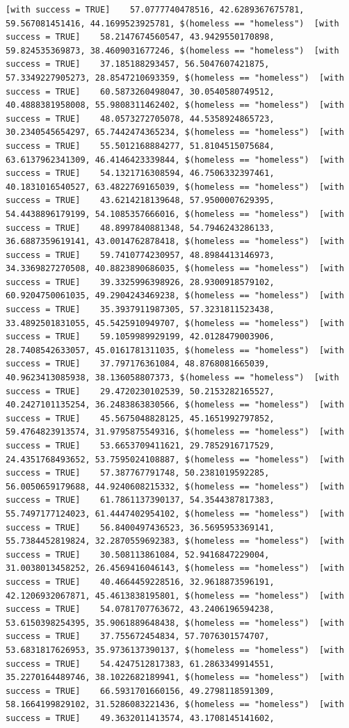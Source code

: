 \documentclass{tufte-book}\usepackage[]{graphicx}\usepackage[]{xcolor}
\makeatletter
\newenvironment{kframe}{%
 \def\at@end@of@kframe{}%
 \ifinner\ifhmode%
  \def\at@end@of@kframe{\end{minipage}}%
  \begin{minipage}{\columnwidth}%
 \fi\fi%
 \def\FrameCommand##1{\hskip\@totalleftmargin \hskip-\fboxsep
 \colorbox{shadecolor}{##1}\hskip-\fboxsep
     \hskip-\linewidth \hskip-\@totalleftmargin \hskip\columnwidth}%
 \MakeFramed {\advance\hsize-\width
   \@totalleftmargin\z@ \linewidth\hsize
   \@setminipage}}%
 {\par\unskip\endMakeFramed%
 \at@end@of@kframe}
\newenvironment{knitrout}{}{} %
\makeatother
\begin{document}
\begin{knitrout}
\begin{kframe}
\begin{verbatim}
[with success = TRUE]    57.0777740478516, 42.6289367675781, 59.567081451416, 44.1699523925781, $(homeless == "homeless")  [with success = TRUE]    58.2147674560547, 43.9429550170898, 59.824535369873, 38.4609031677246, $(homeless == "homeless")  [with success = TRUE]    37.185188293457, 56.5047607421875, 57.3349227905273, 28.8547210693359, $(homeless == "homeless")  [with success = TRUE]    60.5873260498047, 30.0540580749512, 40.4888381958008, 55.9808311462402, $(homeless == "homeless")  [with success = TRUE]    48.0573272705078, 44.5358924865723, 30.2340545654297, 65.7442474365234, $(homeless == "homeless")  [with success = TRUE]    55.5012168884277, 51.8104515075684, 63.6137962341309, 46.4146423339844, $(homeless == "homeless")  [with success = TRUE]    54.1321716308594, 46.7506332397461, 40.1831016540527, 63.4822769165039, $(homeless == "homeless")  [with success = TRUE]    43.6214218139648, 57.9500007629395, 54.4438896179199, 54.1085357666016, $(homeless == "homeless")  [with success = TRUE]    48.8997840881348, 54.7946243286133, 36.6887359619141, 43.0014762878418, $(homeless == "homeless")  [with success = TRUE]    59.7410774230957, 48.8984413146973, 34.3369827270508, 40.8823890686035, $(homeless == "homeless")  [with success = TRUE]    39.3325996398926, 28.9300918579102, 60.9204750061035, 49.2904243469238, $(homeless == "homeless")  [with success = TRUE]    35.3937911987305, 57.3231811523438, 33.4892501831055, 45.5425910949707, $(homeless == "homeless")  [with success = TRUE]    59.1059989929199, 42.0128479003906, 28.7408542633057, 45.0161781311035, $(homeless == "homeless")  [with success = TRUE]    37.797176361084, 48.8768081665039, 40.9623413085938, 38.136058807373, $(homeless == "homeless")  [with success = TRUE]    29.4720230102539, 50.2153282165527, 40.2427101135254, 36.2483863830566, $(homeless == "homeless")  [with success = TRUE]    45.5675048828125, 45.1651992797852, 59.4764823913574, 31.9795875549316, $(homeless == "homeless")  [with success = TRUE]    53.6653709411621, 29.7852916717529, 24.4351768493652, 53.7595024108887, $(homeless == "homeless")  [with success = TRUE]    57.387767791748, 50.2381019592285, 56.0050659179688, 44.9240608215332, $(homeless == "homeless")  [with success = TRUE]    61.7861137390137, 54.3544387817383, 55.7497177124023, 61.4447402954102, $(homeless == "homeless")  [with success = TRUE]    56.8400497436523, 36.5695953369141, 55.7384452819824, 32.2870559692383, $(homeless == "homeless")  [with success = TRUE]    30.508113861084, 52.9416847229004, 31.0038013458252, 26.4569416046143, $(homeless == "homeless")  [with success = TRUE]    40.4664459228516, 32.9618873596191, 42.1206932067871, 45.4613838195801, $(homeless == "homeless")  [with success = TRUE]    54.0781707763672, 43.2406196594238, 53.6150398254395, 35.9061889648438, $(homeless == "homeless")  [with success = TRUE]    37.755672454834, 57.7076301574707, 53.6831817626953, 35.9736137390137, $(homeless == "homeless")  [with success = TRUE]    54.4247512817383, 61.2863349914551, 35.2270164489746, 38.1022682189941, $(homeless == "homeless")  [with success = TRUE]    66.5931701660156, 49.2798118591309, 58.1664199829102, 31.5286083221436, $(homeless == "homeless")  [with success = TRUE]    49.3632011413574, 43.1708145141602, 
\end{verbatim}
\end{kframe}
\end{knitrout}
\end{document}
